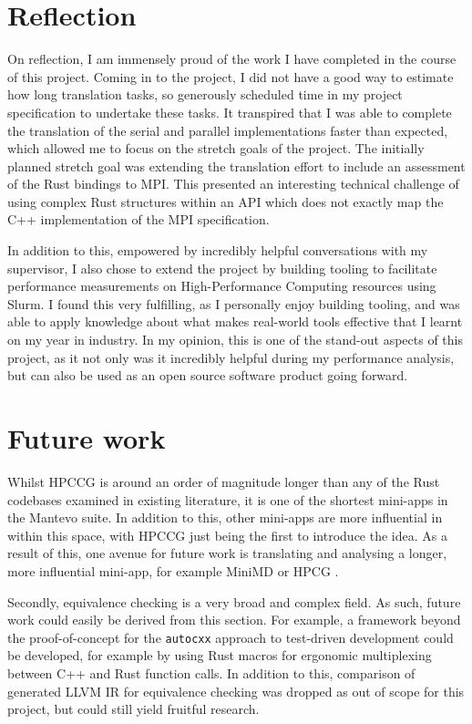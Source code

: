 \section{Reflection}
\label{sec:reflection} %

On reflection, I am immensely proud of the work I have completed in the course of this project. Coming in to the project, I did not have a good way to estimate how long translation tasks, so generously scheduled time in my project specification to undertake these tasks. It transpired that I was able to complete the translation of the serial and parallel implementations faster than expected, which allowed me to focus on the stretch goals of the project. The initially planned stretch goal was extending the translation effort to include an assessment of the Rust bindings to MPI. This presented an interesting technical challenge of using complex Rust structures within an API which does not exactly map the C++ implementation of the MPI specification.

In addition to this, empowered by incredibly helpful conversations with my supervisor, I also chose to extend the project by building tooling to facilitate performance measurements on High-Performance Computing resources using Slurm. I found this very fulfilling, as I personally enjoy building tooling, and was able to apply knowledge about what makes real-world tools effective that I learnt on my year in industry. In my opinion, this is one of the stand-out aspects of this project, as it not only was it incredibly helpful during my performance analysis, but can also be used as an open source software product going forward.


\section{Future work}
\label{sec:future-work} %

Whilst HPCCG is around an order of magnitude longer than any of the Rust codebases examined in existing literature, it is one of the shortest mini-apps in the Mantevo suite. In addition to this, other mini-apps are more influential in within this space, with HPCCG just being the first to introduce the idea. As a result of this, one avenue for future work is translating and analysing a longer, more influential mini-app, for example MiniMD \cite{osti_1231191} or HPCG \cite{dongarra2015hpcg}.

Secondly, equivalence checking is a very broad and complex field. As such, future work could easily be derived from this section. For example, a framework beyond the proof-of-concept for the \texttt{autocxx} approach to test-driven development could be developed, for example by using Rust macros for ergonomic multiplexing between C++ and Rust function calls. In addition to this, comparison of generated LLVM IR for equivalence checking was dropped as out of scope for this project, but could still yield fruitful research.

